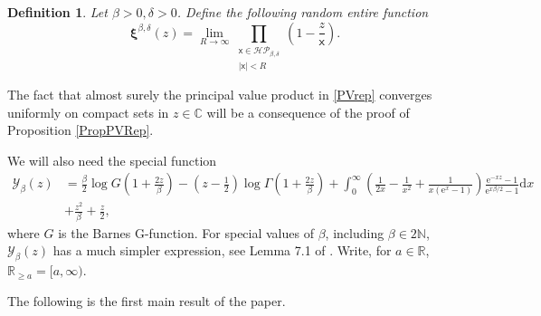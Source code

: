 \documentclass[]{article}
\newtheorem{defn}[thm]{Definition}
\begin{document}
\begin{defn}\label{StochasticZeta} Let $\beta>0, \delta>0$. Define the following random entire function
\begin{equation}\label{PVrep}
\boldsymbol{\xi}^{\beta,\delta}(z)=\lim_{R\to \infty} \prod_{\substack{\mathsf{x} \in \mathcal{HP}_{\beta,\delta} \\ |\mathsf{x}|<R}} \left(1-\frac{z}{\mathsf{x}}\right).
\end{equation}
\end{defn}
The fact that almost surely the principal value product in \eqref{PVrep} converges uniformly on compact sets in $z \in \mathbb{C}$ will be a consequence of the proof of Proposition \ref{PropPVRep}.

We will also need the special function
\begin{align*}
\mathcal{Y}_\beta(z)&=\frac{\beta}{2}\log G\left(1+\frac{2z}{\beta}\right)-\left(z-\frac{1}{2}\right)\log \Gamma\left(1+\frac{2z}{\beta}\right)+\int_0^\infty \left(\frac{1}{2x}-\frac{1}{x^2}+\frac{1}{x(\mathrm{e}^x-1)}\right)\frac{\mathrm{e}^{-xz}-1}{\mathrm{e}^{x\beta/2}-1}\mathrm{d}x\\ &+ \frac{z^2}{\beta}+\frac{z}{2},
\end{align*}
where $G$ is the Barnes G-function. For special values of $\beta$, including $\beta \in 2 \mathbb{N}$, $\mathcal{Y}_\beta(z)$ has a much simpler expression, see Lemma 7.1 of \cite{RandomDets}. Write, for $a\in \mathbb{R}$, $\mathbb{R}_{\ge a}=[a,\infty)$.


The following is the first main result of the paper.
\end{document}
